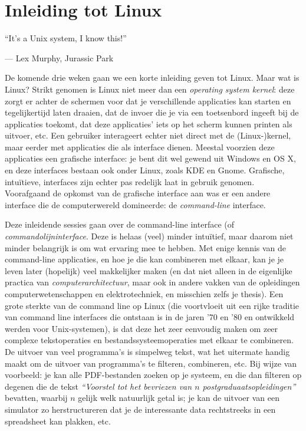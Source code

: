 \documentclass[a4paper,twoside,openany]{memoir}
\begin{document}
\epigraphfontsize{\small\itshape}

\chapter{Inleiding tot Linux}
\epigraph{``It’s a Unix system, I know this!''}{--- \textup{Lex Murphy}, Jurassic Park}

De komende drie weken gaan we een korte inleiding geven tot Linux. Maar wat is
Linux? Strikt genomen is Linux niet meer dan een \emph{operating system kernel}:
deze zorgt er achter de schermen voor dat je verschillende applicaties kan
starten en tegelijkertijd laten draaien, dat de invoer die je via een
toetsenbord ingeeft bij de applicaties toekomt, dat deze applicaties' iets op
het scherm kunnen printen als uitvoer, etc. Een gebruiker interageert echter
niet direct met de (Linux-)kernel, maar eerder met applicaties die als interface
dienen. Meestal voorzien deze applicaties een grafische interface: je bent dit
wel gewend uit Windows en OS X, en deze interfaces bestaan ook onder Linux,
zoals KDE en Gnome. Grafische, intuïtieve, interfaces zijn echter pas redelijk
laat in gebruik genomen. Voorafgaand de opkomst van de grafische interface aan
was er een andere interface die de computerwereld domineerde: de
\emph{command-line} interface.

Deze inleidende sessies gaan over de command-line interface (of
\emph{commandolijninterface}. Deze is  helaas (veel) minder intuïtief, maar
daarom niet minder belangrijk is om wat ervaring mee te hebben. Met enige kennis
van de command-line applicaties, en hoe je die kan combineren met elkaar, kan je
je leven later (hopelijk) veel makkelijker maken (en dat niet alleen in de
eigenlijke practica van \emph{computerarchitectuur}, maar ook in andere vakken
van de opleidingen computerwetenschappen en elektrotechniek, en misschien zelfs
je thesis). Een grote sterkte van de command line op Linux (die voortvloeit uit
een rijke traditie van command line interfaces die ontstaan is in de jaren '70
en '80 en ontwikkeld werden voor Unix-systemen), is dat deze het zeer eenvoudig
maken om zeer complexe tekstoperaties en bestandssysteemoperaties met elkaar te
combineren. De uitvoer van veel programma's is simpelweg tekst, wat het
uitermate handig maakt om de uitvoer van programma's te filteren, combineren,
etc. Bij wijze van voorbeeld: je kan alle PDF-bestanden zoeken op je systeem, en
die dan filteren op degenen die de tekst \emph{``Voorstel tot het bevriezen van
$n$ postgraduaatsopleidingen''} bevatten, waarbij $n$ gelijk welk natuurlijk
getal is; je kan de uitvoer van een simulator zo herstructureren dat je de
interessante data rechtstreeks in een spreadsheet kan plakken, etc.
\end{document}
